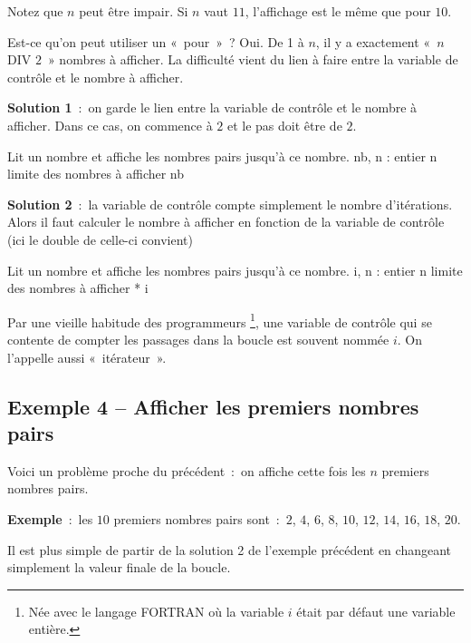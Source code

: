 		Notez que $n$ peut être impair. Si $n$ vaut $11$, 
		l’affichage est le même que pour $10$.

		Est-ce qu’on peut utiliser un «~pour~»~? 
		Oui. De 1 à $n$, il y a exactement «~$n$ DIV $2$~» nombres à afficher. 
		La difficulté vient du lien à faire entre la variable de
		contrôle et le nombre à afficher.

		\textbf{Solution 1}~:~on garde le lien entre la variable de contrôle 
		et le nombre à afficher. 
		Dans ce cas, on commence à $2$ et le pas doit être de $2$.

		\begin{Pseudocode}
		\LComment Lit un nombre et affiche les nombres pairs jusqu’à ce nombre.
			\Decl nb, n : entier
			\Read n
			\RComment limite des nombres à afficher
				\Write nb 
			\EndFor
		\EndModule
		\end{Pseudocode}

		\textbf{Solution 2}~:~la variable de contrôle compte simplement 
		le nombre d’itérations.
		Alors il faut calculer le nombre à afficher en fonction de la variable
		de contrôle (ici le double de celle-ci convient)

		\begin{Pseudocode}
		\LComment Lit un nombre et affiche les nombres pairs jusqu’à ce nombre.
		\Module{afficherPair}{}{} 
			\Decl i, n : entier
			\Read n
			\RComment limite des nombres à afficher
			\For{i \K{de} 1 \K{à} n DIV 2} 
				\Write 2 * i 
			\EndFor
		\EndModule
		\end{Pseudocode}

		Par une vieille habitude des programmeurs%
		\footnote{%
			Née avec le langage FORTRAN 
			où la variable $i$ était par défaut une variable entière.
		},
		une variable de contrôle qui se contente de compter les passages dans
		la boucle est souvent nommée $i$. 
		On l’appelle aussi «~itérateur~».

	\subsection{Exemple 4 -- Afficher les premiers nombres pairs}

		Voici un problème proche du précédent~:~on affiche cette fois 
		les $n$ premiers nombres pairs.
		
		\textbf{Exemple}~:~les $10$ premiers nombres pairs sont~:~$2$, $4$, $6$, $8$, 
		$10$, $12$, $14$, $16$, $18$, $20$.
		
		Il est plus simple de partir de la solution 2 de l’exemple précédent
		en changeant simplement la valeur finale de la boucle.

